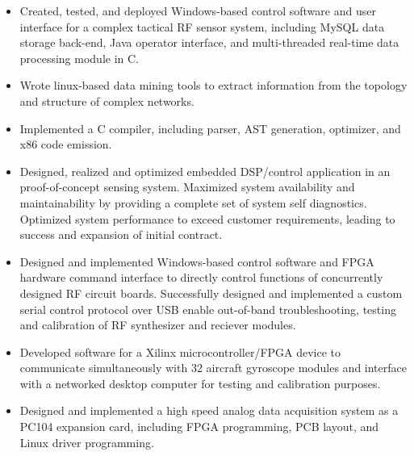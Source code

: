\documentclass[10pt,margin=1in]{article}
\newenvironment{mylist}{
\begin{itemize}
  \setlength{\itemsep}{1pt}
  \setlength{\parskip}{0pt}
  \setlength{\parsep}{0pt}}{\end{itemize}
}
\begin{document}
\begin{mylist}
\begin{comment}
\item
Designed, implemented and tested an 8 channel digiitzer system for a wideband phased array. 180 MSPS x 8 channel capture capability provided full bandwidth data (2.9 GB/sec) to a high performance processing PC. Implemented multi-threaded data capture and processing software in C to perform signal detection and geolocation.
\end{comment}
\item 
Created, tested, and deployed Windows-based control software and user interface for a complex tactical RF sensor system, including MySQL data storage back-end, Java operator interface, and multi-threaded real-time data processing module in C.

\item Wrote linux-based data mining tools to extract information from the topology and structure of complex networks.

\item Implemented a C compiler, including parser, AST generation, optimizer, and x86 code emission.

\item
Designed, realized and optimized embedded DSP/control application in an proof-of-concept sensing system. Maximized system availability and maintainability by providing a complete set of system self diagnostics. Optimized system performance to exceed customer requirements, leading to success and expansion of initial contract.

\item
Designed and implemented Windows-based control software and FPGA hardware command interface to directly control functions of concurrently designed RF circuit boards. 
Successfully designed and implemented a custom serial control protocol over USB enable out-of-band troubleshooting, testing and calibration of RF synthesizer and reciever modules.

\item Developed software for a Xilinx microcontroller/FPGA device to communicate simultaneously with 32 aircraft gyroscope modules and interface with a networked desktop computer for testing and calibration purposes.

\item Designed and implemented a high speed analog data acquisition system as a PC104 expansion card, including FPGA programming, PCB layout, and Linux driver programming. 


\end{mylist}
\end{document}
